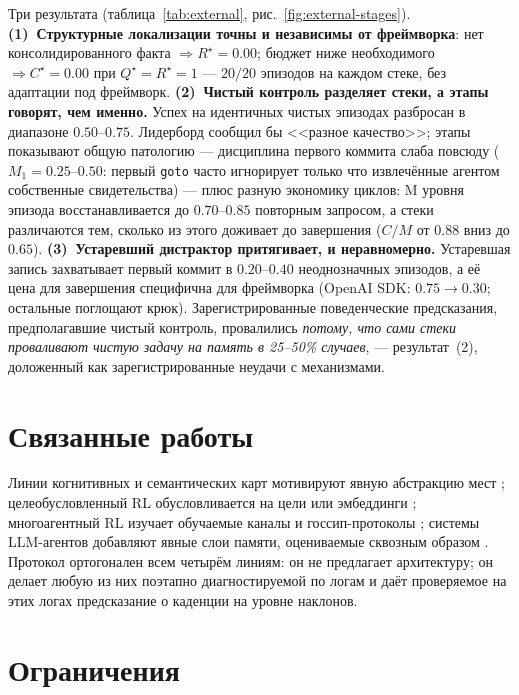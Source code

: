 \documentclass[letterpaper]{article} %
\newcommand{\method}[1]{\texttt{#1}}
\begin{document}
Три результата (таблица~\ref{tab:external},
рис.~\ref{fig:external-stages}). \textbf{(1)~Структурные локализации
точны и независимы от фреймворка}: нет консолидированного факта
$\Rightarrow R^\star{=}0.00$; бюджет ниже необходимого
$\Rightarrow C^\star{=}0.00$ при $Q^\star{=}R^\star{=}1$ --- $20/20$
эпизодов на каждом стеке, без адаптации под фреймворк.
\textbf{(2)~Чистый контроль разделяет стеки, а этапы говорят, чем
именно.} Успех на идентичных чистых эпизодах разбросан в диапазоне
$0.50$--$0.75$. Лидерборд сообщил бы <<разное качество>>; этапы
показывают общую патологию --- дисциплина первого коммита слаба
повсюду ($M_1{=}0.25$--$0.50$: первый \method{goto} часто игнорирует
только что извлечённые агентом собственные свидетельства) --- плюс
разную экономику циклов: M уровня эпизода восстанавливается до
$0.70$--$0.85$ повторным запросом, а стеки различаются тем, сколько
из этого доживает до завершения ($C/M$ от $0.88$ вниз до $0.65$).
\textbf{(3)~Устаревший дистрактор притягивает, и неравномерно.}
Устаревшая запись захватывает первый коммит в $0.20$--$0.40$
неоднозначных эпизодов, а её цена для завершения специфична для
фреймворка (OpenAI SDK: $0.75\!\to\!0.30$; остальные поглощают крюк).
Зарегистрированные поведенческие предсказания, предполагавшие чистый
контроль, провалились \emph{потому, что сами стеки проваливают чистую
задачу на память в 25--50\% случаев}, --- результат~(2), доложенный
как зарегистрированные неудачи с механизмами.

\section{Связанные работы}

Линии когнитивных и семантических карт мотивируют явную абстракцию
мест \citep{tolman1948cognitive,gupta2017cognitive,
savinov2018semi}; целеобусловленный RL обусловливается на цели или
эмбеддинги \citep{andrychowicz2017hindsight}; многоагентный RL
изучает обучаемые каналы \citep{sukhbaatar2016commnet,foerster2018ctde}
и госсип-протоколы \citep{boyd2006gossip}; системы LLM-агентов
добавляют явные слои памяти, оцениваемые сквозным образом
\citep{wang2023voyager,shinn2023reflexion,packer2023memgpt,
park2023generative,wu2023autogen}. Протокол ортогонален всем четырём
линиям: он не предлагает архитектуру; он делает любую из них
поэтапно диагностируемой по логам и даёт проверяемое на этих логах
предсказание о каденции на уровне наклонов.

\section{Ограничения}
\end{document}

